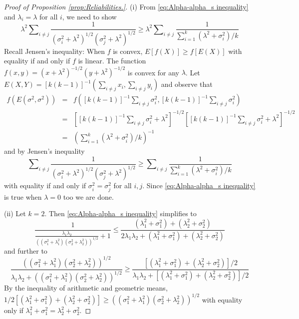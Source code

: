 \documentclass[twoside]{article}
\DeclareMathOperator{\tsum}{\textstyle \sum}
\renewcommand{\sqrt}[1]{{(#1)^{1/2}}}
\begin{document}
\begin{proof}[Proof of Proposition \ref{prop:Reliabilities.}]\label{proof:Reliabilities.}
(i) From \eqref{eq:Alpha-alpha_s inequality} and $\lambda_{i}=\lambda$
for all $i$, we need to show
\[
\lambda^{2}\tsum_{i\neq j}\frac{1}{\sqrt{\sigma_{i}^{2}+\lambda^{2}}\sqrt{\sigma_{j}^{2}+\lambda^{2}}}\geq\lambda^{2}\tsum_{i\neq j}\frac{1}{\tsum_{i=1}^{k}(\lambda^{2}+\sigma_{i}^{2})/k}
\]
Recall Jensen's inequality: When $f$ is convex, $E[f(X)]\geq f[E(X)]$ with equality if and only if $f$ is linear.
The function $f(x,y)=(x+\lambda^{2})^{-1/2}(y+\lambda^{2})^{-1/2}$
is convex for any $\lambda$. Let $E(X,Y)=[k(k-1)]^{-1}(\tsum_{i\neq j}x_{i},\tsum_{i\neq j}y_{i})$
and observe that
\begin{eqnarray*}
f(E(\sigma^{2},\sigma^{2})) & = & f([k(k-1)]^{-1}\tsum_{i\neq j}\sigma_{i}^{2},[k(k-1)]^{-1}\tsum_{i\neq j}\sigma_{i}^{2})\\
 & = & [[k(k-1)]^{-1}\tsum_{i\neq j}\sigma_{i}^{2}+\lambda^{2}]^{-1/2}[[k(k-1)]^{-1}\tsum_{i\neq j}\sigma_{i}^{2}+\lambda^{2}]^{-1/2}\\
 & = & (\tsum_{i=1}^{k}(\lambda^{2}+\sigma_{i}^{2})/k)^{-1}
\end{eqnarray*}
and by Jensen's inequality
\[
\tsum_{i\neq j}\frac{1}{\sqrt{\sigma_{i}^{2}+\lambda^{2}}\sqrt{\sigma_{j}^{2}+\lambda^{2}}}\geq\tsum_{i\neq j}\frac{1}{\tsum_{i=1}^{k}(\lambda^{2}+\sigma_{i}^{2})/k}
\]
with equality if and only if $\sigma_{i}^{2}=\sigma_{j}^{2}$ for
all $i,j$. Since \eqref{eq:Alpha-alpha_s inequality} is true when
$\lambda=0$ too we are done.

(ii) Let $k=2$. Then \eqref{eq:Alpha-alpha_s inequality} simplifies to
\[
\frac{1}{\frac{\lambda_{1}\lambda_{2}}{\sqrt{(\sigma_{1}^{2}+\lambda_{1}^{2})(\sigma_{2}^{2}+\lambda_{2}^{2})}}+1}\leq\frac{(\lambda_{1}^{2}+\sigma_{1}^{2})+(\lambda_{2}^{2}+\sigma_{2}^{2})}{2\lambda_{1}\lambda_{2}+(\lambda_{1}^{2}+\sigma_{1}^{2})+(\lambda_{2}^{2}+\sigma_{2}^{2})}
\]
and further to
\begin{equation*}
\frac{\sqrt{(\sigma_{1}^{2}+\lambda_{1}^{2})(\sigma_{2}^{2}+\lambda_{2}^{2})}}{\lambda_{1}\lambda_{2}+\sqrt{(\sigma_{1}^{2}+\lambda_{1}^{2})(\sigma_{2}^{2}+\lambda_{2}^{2})}} \geq \frac{[(\lambda_{1}^{2}+\sigma_{1}^{2})+(\lambda_{2}^{2}+\sigma_{2}^{2})]/2}{\lambda_{1}\lambda_{2}+[(\lambda_{1}^{2}+\sigma_{1}^{2})+(\lambda_{2}^{2}+\sigma_{2}^{2})]/2}
\end{equation*}
By the inequality of arithmetic and geometric means, $1/2[(\lambda_{1}^{2}+\sigma_{1}^{2})+(\lambda_{2}^{2}+\sigma_{2}^{2})]\geq\sqrt{(\sigma_{1}^{2}+\lambda_{1}^{2})(\sigma_{2}^{2}+\lambda_{2}^{2})}$
with equality only if $\lambda_{1}^{2}+\sigma_{1}^{2}=\lambda_{2}^{2}+\sigma_{2}^{2}$.


\end{proof}
\end{document}
